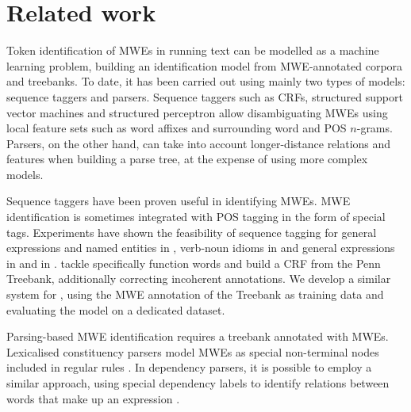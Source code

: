 \documentclass[output=paper,modfonts]{langscibook}
\begin{document}
\section{Related work}
\label{schol:sec:relwork}

Token identification of MWEs in running text can be modelled as a machine learning problem, building an identification model from MWE-annotated corpora and treebanks.
To date, it has been carried out using mainly two types of models: sequence taggers and parsers. Sequence taggers such as CRFs, structured support vector machines and structured perceptron allow disambiguating MWEs using local feature sets such as word affixes and surrounding word and POS $n$-grams. Parsers, on the other hand, can take into account longer-distance relations and features when building a parse tree, at the expense of using more complex models. 

Sequence taggers have been proven useful in identifying MWEs. MWE identification is sometimes integrated with POS tagging in the form of special tags. Experiments have shown the feasibility of sequence tagging for general expressions and named entities in  \citep{vincze-nagyt-berend:2011:MWE}, verb-noun idioms in  \citep{diab-bhutada:2009:MWE09} and general expressions in  \citep{constant-sigogne:2011:MWE}
and in  \citep{Schneider14b,riedl-biemann:2016:MWE}. \citet{shigeto-EtAl:2013:MWE}  tackle specifically  function words and build a CRF from the Penn Treebank, additionally correcting incoherent annotations. We develop a similar system for , using the MWE annotation of the  Treebank as training data and evaluating the model on a dedicated dataset.

Parsing-based MWE identification requires a treebank annotated with MWEs. Lexicalised constituency parsers model MWEs as special non-terminal nodes included in regular rules \citep{Green:2013:PMI:2464100.2464109}. In dependency parsers, it is possible to employ a similar approach, using special dependency labels to identify relations between words that make up an expression \citep{candito-constant:acl:2014}. 
\end{document}
